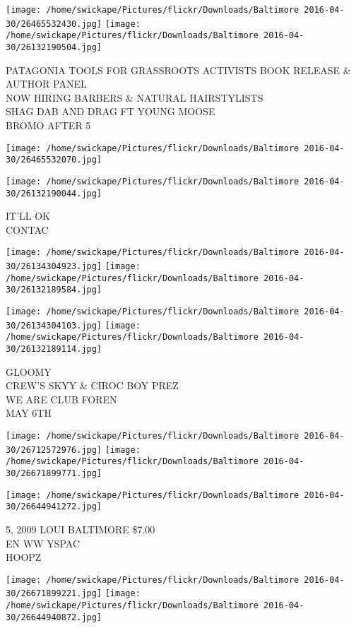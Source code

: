 \documentclass[10pt,letterpaper]{article}
\begin{document}
\texttt{[image: /home/swickape/Pictures/flickr/Downloads/Baltimore 2016-04-30/26465532430.jpg]}
\texttt{[image: /home/swickape/Pictures/flickr/Downloads/Baltimore 2016-04-30/26132190504.jpg]}

PATAGONIA TOOLS FOR GRASSROOTS ACTIVISTS BOOK RELEASE \& AUTHOR PANEL\\
NOW HIRING BARBERS \& NATURAL HAIRSTYLISTS\\
SHAG DAB AND DRAG FT YOUNG MOOSE\\
BROMO AFTER 5
\pagebreak

\texttt{[image: /home/swickape/Pictures/flickr/Downloads/Baltimore 2016-04-30/26465532070.jpg]}

\vspace{0.25in}
\texttt{[image: /home/swickape/Pictures/flickr/Downloads/Baltimore 2016-04-30/26132190044.jpg]}

IT'LL OK\\
CONTAC
\pagebreak

\texttt{[image: /home/swickape/Pictures/flickr/Downloads/Baltimore 2016-04-30/26134304923.jpg]}
\texttt{[image: /home/swickape/Pictures/flickr/Downloads/Baltimore 2016-04-30/26132189584.jpg]}

\texttt{[image: /home/swickape/Pictures/flickr/Downloads/Baltimore 2016-04-30/26134304103.jpg]}
\texttt{[image: /home/swickape/Pictures/flickr/Downloads/Baltimore 2016-04-30/26132189114.jpg]}

GLOOMY\\
CREW'S SKYY \& CIROC BOY PREZ\\
WE ARE CLUB FOREN\\
MAY 6TH
\pagebreak

\texttt{[image: /home/swickape/Pictures/flickr/Downloads/Baltimore 2016-04-30/26712572976.jpg]}
\texttt{[image: /home/swickape/Pictures/flickr/Downloads/Baltimore 2016-04-30/26671899771.jpg]}

\vspace{0.25in}
\texttt{[image: /home/swickape/Pictures/flickr/Downloads/Baltimore 2016-04-30/26644941272.jpg]}

5, 2009 LOUI BALTIMORE \$7.00\\
EN WW YSPAC\\
HOOPZ
\pagebreak

\texttt{[image: /home/swickape/Pictures/flickr/Downloads/Baltimore 2016-04-30/26671899221.jpg]}
\texttt{[image: /home/swickape/Pictures/flickr/Downloads/Baltimore 2016-04-30/26644940872.jpg]}
\end{document}
